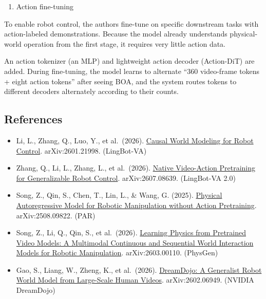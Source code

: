 \begin{enumerate}
\def\labelenumi{\arabic{enumi}.}
\setcounter{enumi}{1}
\tightlist
\item
  Action fine-tuning
\end{enumerate}

To enable robot control, the authors fine-tune on specific downstream tasks with action-labeled demonstrations. Because the model already understands physical-world operation from the first stage, it requires very little action data.

An action tokenizer (an MLP) and lightweight action decoder (Action-DiT) are added. During fine-tuning, the model learns to alternate ``360 video-frame tokens + eight action tokens'' after seeing BOA, and the system routes tokens to different decoders alternately according to their counts.

\FloatBarrier
{}
\hypertarget{references-159}{%
\subsection{References}\label{references-159}}

\vspace{0.25em}
\begin{itemize}
\tightlist
\item
  Li, L., Zhang, Q., Luo, Y., et al.~(2026). \href{https://arxiv.org/abs/2601.21998}{Causal World Modeling for Robot Control}. arXiv:2601.21998. (LingBot-VA)
\item
  Zhang, Q., Li, L., Zhang, L., et al.~(2026). \href{https://arxiv.org/abs/2607.08639}{Native Video-Action Pretraining for Generalizable Robot Control}. arXiv:2607.08639. (LingBot-VA 2.0)
\item
  Song, Z., Qin, S., Chen, T., Lin, L., \& Wang, G. (2025). \href{https://arxiv.org/abs/2508.09822}{Physical Autoregressive Model for Robotic Manipulation without Action Pretraining}. arXiv:2508.09822. (PAR)
\item
  Song, Z., Li, Q., Qin, S., et al.~(2026). \href{https://arxiv.org/abs/2603.00110}{Learning Physics from Pretrained Video Models: A Multimodal Continuous and Sequential World Interaction Models for Robotic Manipulation}. arXiv:2603.00110. (PhysGen)
\item
  Gao, S., Liang, W., Zheng, K., et al.~(2026). \href{https://arxiv.org/abs/2602.06949}{DreamDojo: A Generalist Robot World Model from Large-Scale Human Videos}. arXiv:2602.06949. (NVIDIA DreamDojo)
\end{itemize}

\clearpage
